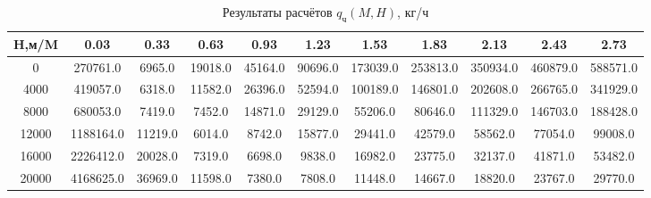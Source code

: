 \begin{table}[H]
\centering
\caption{Результаты расчётов $q_\text{ч}(M,H)$, кг/ч}
\label{nx}
\begin{tabular}{|c|c|c|c|c|c|c|c|c|c|c|}
\toprule
H,м/M &       0.03 &     0.33 &     0.63 &     0.93 &     1.23 &      1.53 &      1.83 &      2.13 &      2.43 &      2.73 \\
\midrule
0     &   270761.0 &   6965.0 &  19018.0 &  45164.0 &  90696.0 &  173039.0 &  253813.0 &  350934.0 &  460879.0 &  588571.0 \\
4000  &   419057.0 &   6318.0 &  11582.0 &  26396.0 &  52594.0 &  100189.0 &  146801.0 &  202608.0 &  266765.0 &  341929.0 \\
8000  &   680053.0 &   7419.0 &   7452.0 &  14871.0 &  29129.0 &   55206.0 &   80646.0 &  111329.0 &  146703.0 &  188428.0 \\
12000 &  1188164.0 &  11219.0 &   6014.0 &   8742.0 &  15877.0 &   29441.0 &   42579.0 &   58562.0 &   77054.0 &   99008.0 \\
16000 &  2226412.0 &  20028.0 &   7319.0 &   6698.0 &   9838.0 &   16982.0 &   23775.0 &   32137.0 &   41871.0 &   53482.0 \\
20000 &  4168625.0 &  36969.0 &  11598.0 &   7380.0 &   7808.0 &   11448.0 &   14667.0 &   18820.0 &   23767.0 &   29770.0 \\
\bottomrule
\end{tabular}
\end{table}
